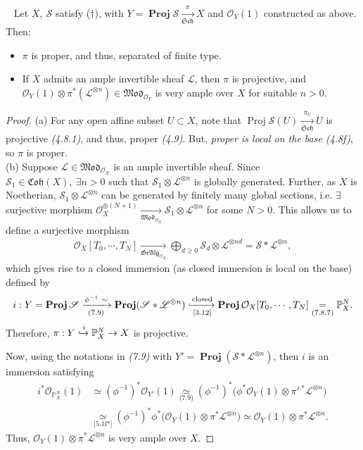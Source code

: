 \documentclass[11pt,a4paper,footinclude=true,headinclude=true]{scrbook} %
\DeclareMathOperator{\Proj}{Proj}
\DeclareMathOperator{\PROJ}{\mathbf{Proj}}
\newcommand{\LL}{\mathscr{L}}
\newcommand{\OO}{\mathcal{O}}
\newcommand{\Ss}{\mathscr{S}}
\newcommand{\PP}{\mathbb{P}}
\newcommand{\Sch}{\mathfrak{Sch}}
\newcommand{\<}{\langle}
\newcommand{\>}{\rangle}
\newcommand{\GR}{\mathfrak{Gr}}
\newcommand{\MOD}{\mathfrak{Mod}}
\newcommand{\ALG}{\mathfrak{Alg}}
\newcommand{\coh}{\mathfrak{Coh}}
\newenvironment{proposition}[2][]
{\renewcommand\theinnercustomprop{#2}\innercustomprop[#1] 
\begin{mdframed}[backgroundcolor=gray!20]\ }
{\end{mdframed}\endinnercustomprop}
\begin{document}
\begin{proposition}{7.10}
    Let $X,\ \Ss$ satisfy ($\dagger$), with $Y=\PROJ\Ss\xrightarrow[\Sch]{\pi}X$ and $\OO_Y(1)$ constructed as above. Then:
    \begin{itemize}
        \item[(a)] $\pi$ is proper, and thus, separated of finite type.
        \item[(b)] If $X$ admits an ample invertible sheaf $\LL$, then $\pi$ is projective, and $\OO_Y(1)\otimes\pi^\ast(\LL^{\otimes n})\in\MOD_{\OO_Y}$ is very ample over $X$ for suitable $n>0$.
    \end{itemize}
\end{proposition}
\begin{proof}
    (a) For any open affine subset $U\subset X$, note that $\Proj\Ss(U)\xrightarrow[\Sch]{\pi_U}U$ is projective \textit{(4.8.1)}, and thus, proper \textit{(4.9)}. But, \textit{proper is local on the base (4.8f)}, so $\pi$ is proper.\\
    
    (b) Suppose $\LL\in\MOD_{\OO_X}$ is an ample invertible sheaf. Since $\Ss_1\in\coh(X),\ \exists n>0$ such that $\Ss_1\otimes\LL^{\otimes n}$ is globally generated. Further, as $X$ is Noetherian, $\Ss_1\otimes\LL^{\otimes n}$ can be generated by finitely many global sections, i.e. $\exists$ surjective morphism $\OO_X^{\oplus(N+1)}\xrightarrow[\MOD_{\OO_X}]{}\Ss_1\otimes\LL^{\otimes n}$ for some $N>0$. This allows us to define a surjective morphism
    \begin{align*}
        \OO_X[T_0,\cdots,T_N]\xrightarrow[\GR\ALG_{\OO_X}]{}\bigoplus_{d\geq0}\Ss_d\otimes\LL^{\otimes nd}=\Ss\ast\LL^{\otimes n},
    \end{align*}
    which gives rise to a closed immersion (as closed immersion is local on the base) defined by
    \begin{align*}
        i:Y=\PROJ\Ss\xrightarrow[\text{(7.9)}]{\phi^{-1}\ \sim}\PROJ(\Ss\ast\LL^{\otimes n})\xhookrightarrow[\text{[3.12]}]{\text{closed}}\PROJ\OO_X[T_0,\cdots,T_N]\underset{\text{(7.8.7)}}{=}\PP_X^N.
    \end{align*}
    Therefore, $\pi:Y\xhookrightarrow{i}\PP_X^N\to X$ is projective.
    
    Now, using the notations in \textit{(7.9)} with $Y'=\PROJ(\Ss\ast\LL^{\otimes n})$, then $i$ is an immersion satisfying
    \begin{align*}
        i^\ast\OO_{\PP_X^N}(1) &\simeq(\phi^{-1})^\ast\OO_{Y'}(1)\underset{\text{(7.9)}}{\simeq}(\phi^{-1})^\ast\Big(\phi^\ast\OO_Y(1)\otimes\pi'\,^\ast\LL^{\otimes n}\Big)\\
        &\underset{\text{[5.1f*]}}{\simeq}(\phi^{-1})^\ast\phi^\ast\Big(\OO_Y(1)\otimes\pi^\ast\LL^{\otimes n}\Big)\simeq\OO_Y(1)\otimes\pi^\ast\LL^{\otimes n}.
    \end{align*}
    Thus, $\OO_Y(1)\otimes\pi^\ast\LL^{\otimes n}$ is very ample over $X$.
\end{proof}
\end{document}
